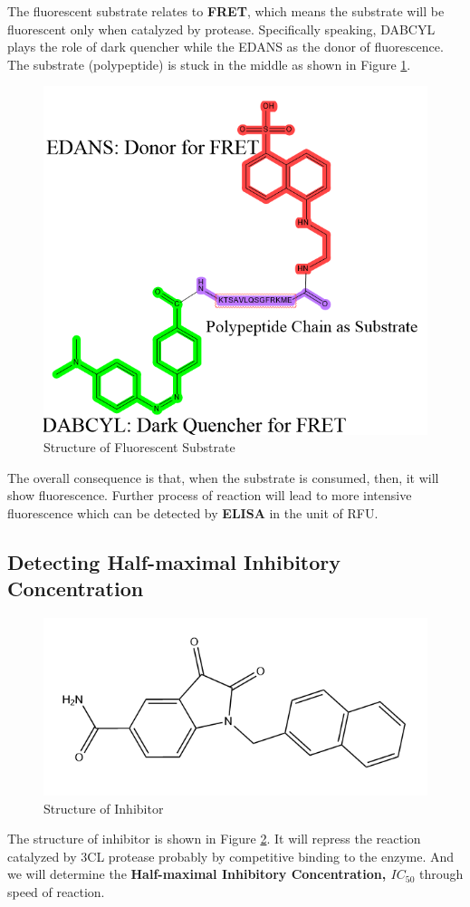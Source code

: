 \documentclass{report}
\begin{document}
The fluorescent substrate relates to \textbf{FRET}, which means the substrate will be fluorescent only when catalyzed by protease.
Specifically speaking, DABCYL plays the role of dark quencher\cite{Quencher} while the EDANS\cite{EDANS} as the donor of fluorescence.
The substrate (polypeptide) is stuck in the middle as shown in Figure \ref{Structure of Fluorescent Substrate}.
\begin{figure}
    \centering
    \includegraphics[width=0.5\linewidth]{../Figures/fluorescent substrate.png}
    \caption{Structure of Fluorescent Substrate}
    \label{Structure of Fluorescent Substrate}
\end{figure}

The overall consequence is that, when the substrate is consumed, then, it will show fluorescence.
Further process of reaction will lead to more intensive fluorescence which can be detected by \textbf{ELISA} in the unit of RFU.

\subsection{Detecting Half-maximal Inhibitory Concentration}
\begin{figure}
    \centering
    \includegraphics[width=0.5\linewidth]{../Figures/inhibitor structure.png}
    \caption{Structure of Inhibitor}
    \label{Structure of Inhibitor}
\end{figure}
The structure of inhibitor is shown in Figure \ref{Structure of Inhibitor}.
It will repress the reaction catalyzed by 3CL protease probably by competitive binding to the enzyme.
And we will determine the \textbf{Half-maximal Inhibitory Concentration, $IC_{50}$} through speed of reaction.
\end{document}
